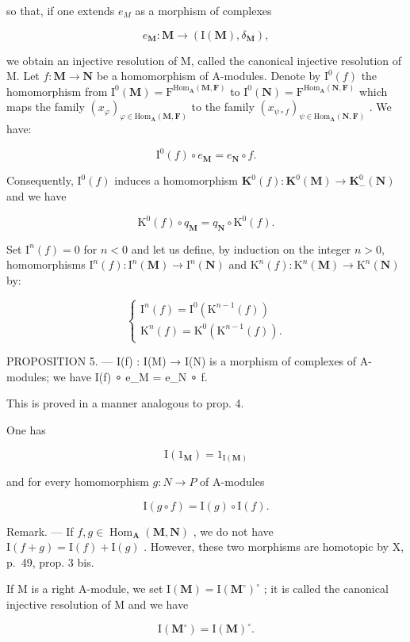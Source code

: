 so that, if one extends \(e_{M}\) as a morphism of complexes

\[
e _ {\mathbf {M}}: \mathbf {M} \rightarrow (\mathrm{I} (\mathbf {M}), \delta_ {\mathbf {M}}),
\]

we obtain an injective resolution of M, called the canonical injective resolution of M. Let \(f: \mathbf{M} \to \mathbf{N}\) be a homomorphism of A-modules. Denote by \(\mathrm{I}^{0}(f)\) the homomorphism from \(\mathrm{I}^{0}(\mathbf{M}) = \mathrm{F}^{\mathrm{Hom}_{\mathbf{A}}(\mathbf{M},\mathbf{F})}\) to \(\mathrm{I}^{0}(\mathbf{N}) = \mathrm{F}^{\mathrm{Hom}_{\mathbf{A}}(\mathbf{N},\mathbf{F})}\) which maps the family \((x_{\varphi})_{\varphi \in \mathrm{Hom}_{\mathbf{A}}(\mathbf{M},\mathbf{F})}\) to the family \((x_{\psi \circ f})_{\psi \in \mathrm{Hom}_{\mathbf{A}}(\mathbf{N},\mathbf{F})}\) . We have:

\[
\mathrm{I} ^ {0} (f) \circ e _ {\mathbf {M}} = e _ {\mathbf {N}} \circ f.\tag{11}
\]

Consequently, \(\mathrm{I}^0 (f)\) induces a homomorphism \(\mathbf{K}^0 (f):\mathbf{K}^0 (\mathbf{M})\to \mathbf{K}_-^0 (\mathbf{N})\) and we have

\[
\mathrm{K} ^ {0} (f) \circ q _ {\mathbf {M}} = q _ {\mathbf {N}} \circ \mathrm{K} ^ {0} (f).\tag{12}
\]

Set \(\mathrm{I}^n(f) = 0\) for \(n < 0\) and let us define, by induction on the integer \(n > 0\), homomorphisms \(\mathrm{I}^n(f): \mathrm{I}^n(\mathbf{M}) \to \mathrm{I}^n(\mathbf{N})\) and \(\mathrm{K}^n(f): \mathrm{K}^n(\mathbf{M}) \to \mathrm{K}^n(\mathbf{N})\) by:

\[
\left\{ \begin{array}{l} \mathrm{I} ^ {n} (f) = \mathrm{I} ^ {0} (\mathrm{K} ^ {n - 1} (f)) \\ \mathrm{K} ^ {n} (f) = \mathrm{K} ^ {0} (\mathrm{K} ^ {n - 1} (f)). \end{array} \right.\tag{13}
\]

PROPOSITION 5. --- I(f) : I(M) → I(N) is a morphism of complexes of A-modules; we have I(f) ∘ e\_M = e\_N ∘ f.

This is proved in a manner analogous to prop. 4.

One has

\[
\mathrm{I} (1 _ {\mathbf {M}}) = 1 _ {\mathrm{I} (\mathbf {M})}\tag{14}
\]

and for every homomorphism \(g: N \rightarrow P\) of A-modules

\[
\mathrm{I} (g \circ f) = \mathrm{I} (g) \circ \mathrm{I} (f).\tag{15}
\]

Remark. --- If \(f, g \in \operatorname{Hom}_{\mathbf{A}}(\mathbf{M}, \mathbf{N})\) , we do not have \(\mathrm{I}(f + g) = \mathrm{I}(f) + \mathrm{I}(g)\) . However, these two morphisms are homotopic by X, p.~49, prop. 3 bis.

If M is a right A-module, we set \(\mathrm{I}(\mathbf{M}) = \mathrm{I}(\mathbf{M}^{\circ})^{\circ}\) ; it is called the canonical injective resolution of M and we have

\[
\mathrm{I} (\mathbf {M} ^ {\circ}) = \mathrm{I} (\mathbf {M}) ^ {\circ}.
\]

